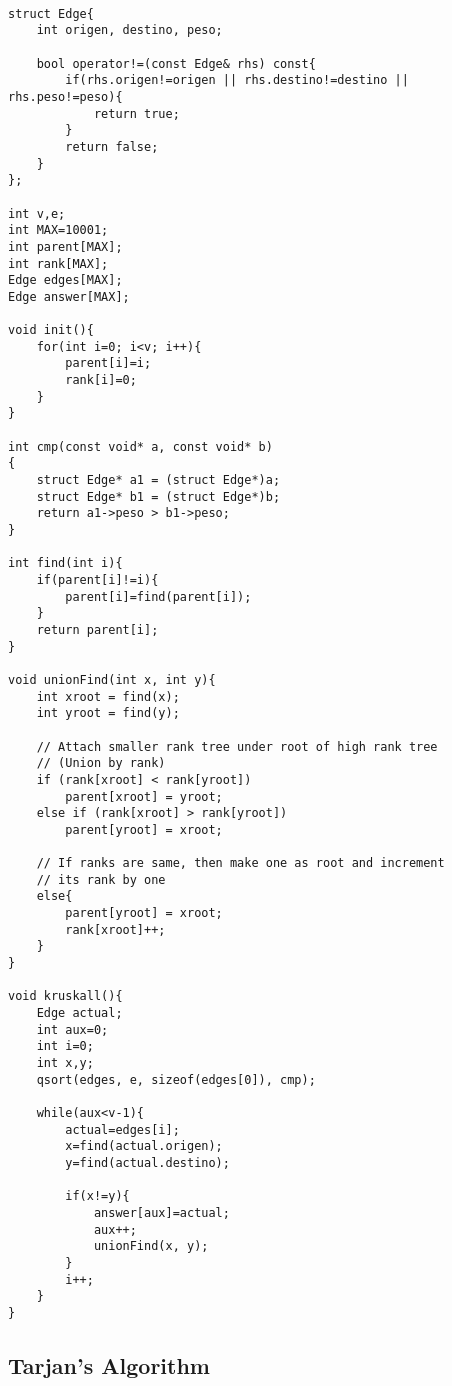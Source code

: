 \documentclass[11pt,letterpaper,twocolumn,twosided]{article}
\begin{document}
\begin{lstlisting}

struct Edge{
    int origen, destino, peso;

    bool operator!=(const Edge& rhs) const{
        if(rhs.origen!=origen || rhs.destino!=destino || rhs.peso!=peso){
            return true;
        }
        return false;
    }
};

int v,e;
int MAX=10001;
int parent[MAX];
int rank[MAX]; 
Edge edges[MAX];
Edge answer[MAX];

void init(){
    for(int i=0; i<v; i++){
        parent[i]=i;
        rank[i]=0;
    }
}

int cmp(const void* a, const void* b)
{   
    struct Edge* a1 = (struct Edge*)a;
    struct Edge* b1 = (struct Edge*)b;
    return a1->peso > b1->peso;
}

int find(int i){
    if(parent[i]!=i){
        parent[i]=find(parent[i]);
    }
    return parent[i];
}

void unionFind(int x, int y){
    int xroot = find(x);
    int yroot = find(y);
 
    // Attach smaller rank tree under root of high rank tree
    // (Union by rank)
    if (rank[xroot] < rank[yroot])
        parent[xroot] = yroot;
    else if (rank[xroot] > rank[yroot])
        parent[yroot] = xroot;
 
    // If ranks are same, then make one as root and increment
    // its rank by one
    else{
        parent[yroot] = xroot;
        rank[xroot]++;
    }
}

void kruskall(){
    Edge actual;
    int aux=0;
    int i=0;
    int x,y;
    qsort(edges, e, sizeof(edges[0]), cmp);

    while(aux<v-1){
        actual=edges[i];
        x=find(actual.origen);
        y=find(actual.destino);

        if(x!=y){
            answer[aux]=actual;
            aux++;
            unionFind(x, y);
        }
        i++;
    }
}
\end{lstlisting}

\subsection{Tarjan's Algorithm}
\end{document}
